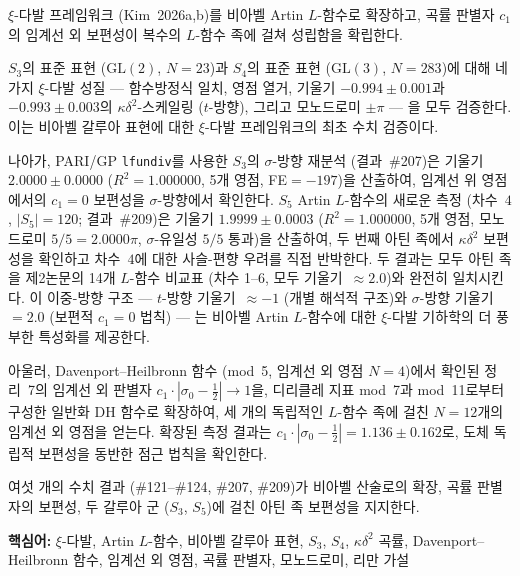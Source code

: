 \documentclass[11pt, a4paper]{article}
\theoremstyle{plain}
\theoremstyle{definition}
\newcommand{\abs}[1]{\left|#1\right|}
\newcommand{\kap}{\kappa}             %
\begin{document}
\begin{tcolorbox}[
  colback=lightbg, colframe=zetaviolet!60!black,
  title={\bfseries 초록}, fonttitle=\large,
  arc=3pt, boxrule=0.8pt, toptitle=3pt, bottomtitle=3pt
]
$\xi$-다발 프레임워크 (Kim~2026a,b)를 비아벨 Artin $L$-함수로 확장하고,
곡률 판별자 $c_{1}$의 임계선 외 보편성이 복수의 $L$-함수 족에 걸쳐
성립함을 확립한다.

$S_{3}$의 표준 표현 ($\mathrm{GL}(2)$, $N=23$)과 $S_{4}$의 표준 표현
($\mathrm{GL}(3)$, $N=283$)에 대해 네 가지 $\xi$-다발 성질
--- 함수방정식 일치, 영점 열거, 기울기 $-0.994\pm0.001$과
$-0.993\pm0.003$의 $\kap\delta^{2}$-스케일링 ($t$-방향), 그리고 모노드로미 $\pm\pi$ ---
을 모두 검증한다. 이는 비아벨 갈루아 표현에 대한 $\xi$-다발 프레임워크의
최초 수치 검증이다.

나아가, PARI/GP \texttt{lfundiv}를 사용한 $S_{3}$의 $\sigma$-방향 재분석
(결과~\#207)은 기울기 $2.0000\pm0.0000$ ($R^{2}=1.000000$, 5개 영점,
FE${}=-197$)을 산출하여, 임계선 위 영점에서의 $c_{1}=0$ 보편성을
$\sigma$-방향에서 확인한다.
$S_{5}$ Artin $L$-함수의 새로운 측정 (차수~$4$, $|S_{5}|=120$; 결과~\#209)은
기울기 $1.9999\pm0.0003$ ($R^{2}=1.000000$, 5개 영점, 모노드로미 $5/5=2.0000\pi$,
$\sigma$-유일성 $5/5$ 통과)을 산출하여, 두 번째 아틴 족에서
$\kap\delta^{2}$ 보편성을 확인하고 차수~$4$에 대한 사슬-편향 우려를
직접 반박한다.
두 결과는 모두 아틴 족을 제2논문의 14개 $L$-함수 비교표
(차수 1--6, 모두 기울기~$\approx 2.0$)와 완전히 일치시킨다.
이 이중-방향 구조 --- $t$-방향 기울기~$\approx{-1}$ (개별 해석적 구조)와
$\sigma$-방향 기울기~$=2.0$ (보편적 $c_{1}=0$ 법칙) --- 는
비아벨 Artin $L$-함수에 대한 $\xi$-다발 기하학의 더 풍부한 특성화를 제공한다.

아울러, Davenport--Heilbronn 함수 (mod~5, 임계선 외 영점 $N=4$)에서
확인된 정리~7의 임계선 외 판별자 $c_{1}\cdot\abs{\sigma_{0}-\tfrac{1}{2}} \to 1$을,
디리클레 지표 mod~7과 mod~11로부터 구성한 일반화 DH 함수로 확장하여,
세 개의 독립적인 $L$-함수 족에 걸친 $N=12$개의 임계선 외 영점을 얻는다.
확장된 측정 결과는 $c_{1}\cdot\abs{\sigma_{0}-\tfrac{1}{2}} = 1.136 \pm 0.162$로,
도체 독립적 보편성을 동반한 점근 법칙을 확인한다.

\smallskip
\noindent 여섯 개의 수치 결과 (\#121--\#124, \#207, \#209)가 비아벨 산술로의 확장,
곡률 판별자의 보편성, 두 갈루아 군 ($S_{3}$, $S_{5}$)에 걸친
아틴 족 보편성을 지지한다.
\end{tcolorbox}

\vspace{0.5em}
\noindent\textbf{핵심어:} $\xi$-다발, Artin $L$-함수,
비아벨 갈루아 표현, $S_{3}$, $S_{4}$,
$\kap\delta^{2}$ 곡률, Davenport--Heilbronn 함수,
임계선 외 영점, 곡률 판별자, 모노드로미, 리만 가설
\end{document}
